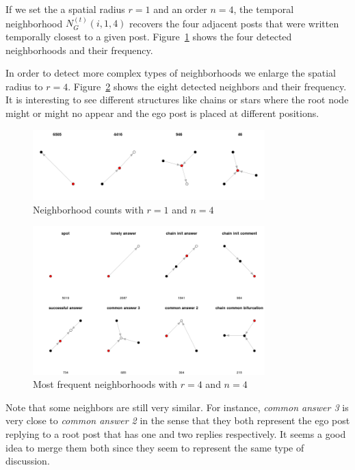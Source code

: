 \documentclass[smallextended]{svjour3}          %
\begin{document}
If we set the a spatial radius $r=1$ and an order $n=4$, the temporal neighborhood $N_{G}^{(t)}(i, 1, 4)$ recovers the four adjacent posts that were written temporally closest to a given post. Figure~\ref{fig:neighborhoods_1_4} shows the four detected neighborhoods and their frequency.

In order to detect more complex types of neighborhoods we enlarge the spatial radius to $r=4$. Figure~\ref{fig:neighborhoods_4_4} shows the eight detected neighbors and their frequency. It is interesting to see different structures like chains or stars where the root node might or might no appear and the ego post is placed at different positions.

\begin{figure}
	\centering
	\includegraphics[width=0.8\textwidth]{neighborhoods_1_4}
	\caption{Neighborhood counts with $r=1$ and $n=4$}
	\label{fig:neighborhoods_1_4}
\end{figure}

\begin{figure}
	\centering
	\includegraphics[width=0.8\textwidth]{neighborhoods_4_4}
	\caption{Most frequent neighborhoods with $r=4$ and $n=4$}
	\label{fig:neighborhoods_4_4}
\end{figure}

Note that some neighbors are still very similar. For instance, \textit{common answer 3} is very close to \textit{common answer 2} in the sense that they both represent the ego post replying to a root post that has one and two replies respectively. It seems a good idea to merge them both since they seem to represent the same type of discussion.
\end{document}
